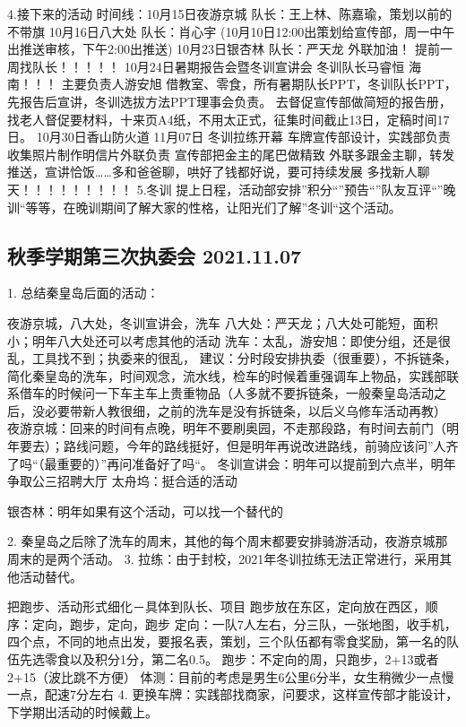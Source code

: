 \documentclass{ctexbook}
\begin{document}
4.接下来的活动 时间线：10月15日夜游京城  队长：王上林、陈嘉瑜，策划以前的    不带旗         10月16日八大处  队长：肖心宇             (10月10日12:00出策划给宣传部，周一中午出推送审核，下午2:00出推送) 10月23日银杏林 队长：严天龙  外联加油！   提前一周找队长！！！！！ 10月24日暑期报告会暨冬训宣讲会 冬训队长马睿恒  海南！！！     主要负责人游安旭 借教室、零食，所有暑期队长PPT，冬训队长PPT，先报告后宣讲，冬训选拔方法PPT理事会负责。     去督促宣传部做简短的报告册，找老人督促要材料，十来页A4纸，不用太正式，征集时间截止13日，定稿时间17日。 10月30日香山防火道  11月07日 冬训拉练开幕  车牌宣传部设计，实践部负责 收集照片制作明信片外联负责 宣传部把金主的尾巴做精致 外联多跟金主聊，转发推送，宣讲恰饭……多和爸爸聊，哄好了钱都好说，要可持续发展 多找新人聊天！！！！！！！！！  5.冬训 提上日程，活动部安排''积分``''预告``''队友互评``''晚训``等等，在晚训期间了解大家的性格，让阳光们了解''冬训``这个活动。 
\subsection{秋季学期第三次执委会 2021.11.07}

1. 总结秦皇岛后面的活动：

夜游京城，八大处，冬训宣讲会，洗车 八大处：严天龙；八大处可能短，面积小；明年八大处还可以考虑其他的活动 洗车：太乱，游安旭：即使分组，还是很乱，工具找不到；执委来的很乱， 建议：分时段安排执委（很重要），不拆链条，简化秦皇岛的洗车，时间观念，流水线，检车的时候着重强调车上物品，实践部联系借车的时候问一下车主车上贵重物品（人多就不要拆链条，一般秦皇岛活动之后，没必要带新人教很细，之前的洗车是没有拆链条，以后义乌修车活动再教）  夜游京城：回来的时间有点晚，明年不要刷奥园，不走那段路，有时间去前门（明年要去）；路线问题，今年的路线挺好，但是明年再说改进路线，前骑应该问''人齐了吗``（最重要的）''再问准备好了吗``。  冬训宣讲会：明年可以提前到六点半，明年争取公三招聘大厅  太舟坞：挺合适的活动 

银杏林：明年如果有这个活动，可以找一个替代的 

2. 秦皇岛之后除了洗车的周末，其他的每个周末都要安排骑游活动，夜游京城那周末的是两个活动。 3. 拉练：由于封校，2021年冬训拉练无法正常进行，采用其他活动替代。

把跑步、活动形式细化－具体到队长、项目 跑步放在东区，定向放在西区，顺序：定向，跑步，定向，跑步 定向：一队7人左右，分三队，一张地图，收手机，四个点，不同的地点出发，要报名表，策划，三个队伍都有零食奖励，第一名的队伍先选零食以及积分1分，第二名0.5。 跑步：不定向的周，只跑步，2+13或者2+15（波比跳不方便） 体测：目前的考虑是男生6公里6分半，女生稍微少一点慢一点，配速7分左右 4. 更换车牌：实践部找商家，问要求，这样宣传部才能设计，下学期出活动的时候戴上。
 
\end{document}
